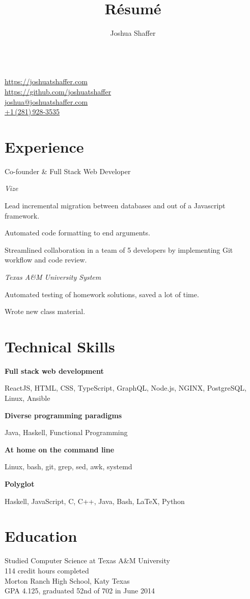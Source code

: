 \documentclass{article}
\title{R\'esum\'e}
\author{Joshua Shaffer}
\newcommand{\jskill}[2]{
\noindent
\begin{minipage}[t]{.15\textwidth}
\raggedleft{#1}
\end{minipage}
\hspace{.1em}
\begin{minipage}[t]{.80\textwidth}
#2
\end{minipage}

\vspace{0.75em}}
\newcommand{\entry}[4]{
\jskill{#1}{#2

\textit{#3}

\footnotesize{#4}}
}
\begin{document}
\begin{center}
    \mbox{\huge\bfseries\theauthor} \\
    \mbox{\href{https://joshuatshaffer.com}{https://joshuatshaffer.com}} \\
    \mbox{\href{https://github.com/joshuatshaffer}{https://github.com/joshuatshaffer}} \\
    \mbox{\href{mailto:joshua@joshuatshaffer.com}{joshua@joshuatshaffer.com}} \\
    \mbox{\href{tel:+12819283535}{+1\,(281)\,928-3535}}
\end{center}

\section{Experience}

\entry
{2018--Present}
{Co-founder \& Full Stack Web Developer}
{Vize}
{Lead incremental migration between databases and out of a Javascript framework.

    Automated code formatting to end arguments.

    Streamlined collaboration in a team of 5 developers by implementing Git workflow and code review.

}

\entry
{2017-2018}
{}
{Texas A\&M University System}
{Automated testing of homework solutions, saved a lot of time.

    Wrote new class material.}

\section{Technical Skills}

 {\centering

  \textbf{Full stack web development}

  ReactJS, HTML, CSS, TypeScript, GraphQL, Node.js, NGINX, PostgreSQL, Linux, Ansible

  \textbf{Diverse programming paradigms}

  Java, Haskell, Functional Programming

  \textbf{At home on the command line}

  Linux, bash, git, grep, sed, awk, systemd

  \textbf{Polyglot}

  Haskell, JavaScript, C, C++, Java, Bash, LaTeX, Python



 }

\section{Education}

\noindent
Studied Computer Science at Texas A\&M University\\
114 credit hours completed\\[1em]
Morton Ranch High School, Katy Texas\\
GPA 4.125, graduated 52nd of 702 in June 2014


\end{document}
